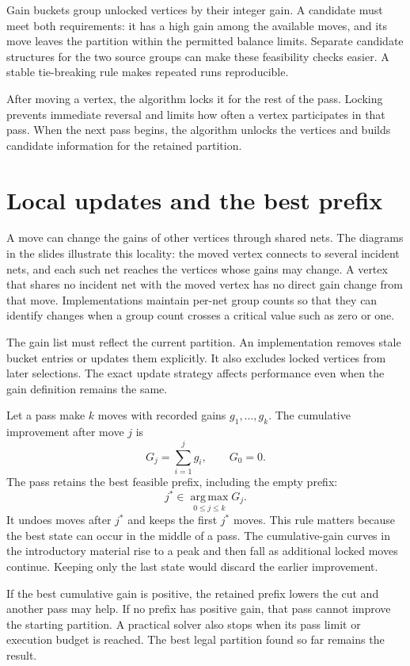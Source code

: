 \documentclass[11pt,a4paper]{article}
\begin{document}
Gain buckets group unlocked vertices by their integer gain. A candidate must meet both requirements: it has a high gain among the available moves, and its move leaves the partition within the permitted balance limits. Separate candidate structures for the two source groups can make these feasibility checks easier. A stable tie-breaking rule makes repeated runs reproducible.

After moving a vertex, the algorithm locks it for the rest of the pass. Locking prevents immediate reversal and limits how often a vertex participates in that pass. When the next pass begins, the algorithm unlocks the vertices and builds candidate information for the retained partition.

\section{Local updates and the best prefix}

A move can change the gains of other vertices through shared nets. The diagrams in the slides illustrate this locality: the moved vertex connects to several incident nets, and each such net reaches the vertices whose gains may change. A vertex that shares no incident net with the moved vertex has no direct gain change from that move. Implementations maintain per-net group counts so that they can identify changes when a group count crosses a critical value such as zero or one.

The gain list must reflect the current partition. An implementation removes stale bucket entries or updates them explicitly. It also excludes locked vertices from later selections. The exact update strategy affects performance even when the gain definition remains the same.

Let a pass make $k$ moves with recorded gains $g_1,\ldots,g_k$. The cumulative improvement after move $j$ is
\[
 G_j=\sum_{i=1}^{j}g_i,\qquad G_0=0.
\]
The pass retains the best feasible prefix, including the empty prefix:
\[
 j^*\in\operatorname*{arg\,max}_{0\le j\le k}G_j.
\]
It undoes moves after $j^*$ and keeps the first $j^*$ moves. This rule matters because the best state can occur in the middle of a pass. The cumulative-gain curves in the introductory material rise to a peak and then fall as additional locked moves continue. Keeping only the last state would discard the earlier improvement.

If the best cumulative gain is positive, the retained prefix lowers the cut and another pass may help. If no prefix has positive gain, that pass cannot improve the starting partition. A practical solver also stops when its pass limit or execution budget is reached. The best legal partition found so far remains the result.
\end{document}
